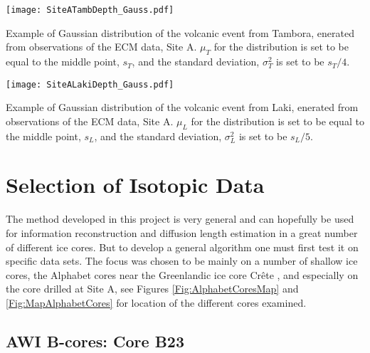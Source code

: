 \documentclass[../../CompleteThesis2/Complete_2ndDraft]{subfiles}
\begin{document}
\begin{marginfigure}
	\centering
	\texttt{[image: SiteATambDepth\_Gauss.pdf]}
	\caption[Corrected Tambora event, Site A]{\footnotesize Example of Gaussian distribution of the volcanic event from Tambora,  enerated from observations of the ECM data, Site A. $\mu_T$ for the distribution is set to be equal to the middle point, $s_T$, and the standard deviation, $\sigma_T^2$ is set to be $s_T/4$.}
	\label{Fig:DATA_SiteA_TambDepth_Gauss}
\end{marginfigure}


\begin{marginfigure}
	\centering
	\texttt{[image: SiteALakiDepth\_Gauss.pdf]}
	\caption[Corrected Laki event, Site A]{\footnotesize Example of Gaussian distribution of the volcanic event from Laki,  enerated from observations of the ECM data, Site A. $\mu_L$ for the distribution is set to be equal to the middle point, $s_L$, and the standard deviation, $\sigma_L^2$ is set to be $s_L/5$.}
	\label{Fig:DATA_SiteA_LakiDepth_Gauss}
\end{marginfigure}



\section[Selection][Selection]{Selection of Isotopic Data}
\label{Sec:Data_Selection}


The method developed in this project is very general and can hopefully be used for information reconstruction and diffusion length estimation in a great number of different ice cores. But to develop a general algorithm one must first test it on specific data sets. The focus was chosen to be mainly on a number of shallow ice cores, the Alphabet cores near the Greenlandic ice core Crête \cite{ClausenHammer1988}, and especially on the core drilled at Site A, see Figures  \ref{Fig:AlphabetCoresMap} and \ref{Fig:MapAlphabetCores} for location of the different cores examined.

\subsection[AWI B-cores]{AWI B-cores: Core B23}
\label{Subsec:Data_Selection_Bcores}
\end{document}
